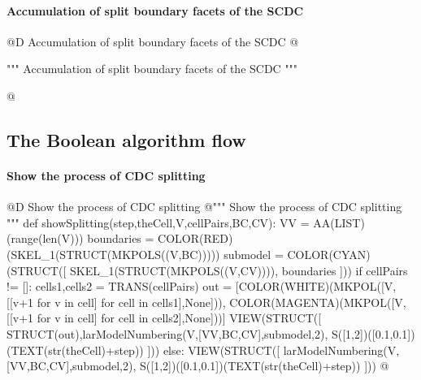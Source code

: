 \documentclass[11pt,oneside]{article}	%
\begin{document}
\paragraph{Accumulation of split boundary facets of the SCDC}

@D Accumulation of split boundary facets of the SCDC
@{""" Accumulation of split boundary facets of the SCDC """

@}



\subsection{The Boolean algorithm flow}


\paragraph{Show the process of CDC splitting}

@D Show the process of CDC splitting
@{""" Show the process of CDC splitting """
def showSplitting(step,theCell,V,cellPairs,BC,CV):
	VV = AA(LIST)(range(len(V)))
	boundaries = COLOR(RED)(SKEL_1(STRUCT(MKPOLS((V,BC)))))
	submodel = COLOR(CYAN)(STRUCT([ SKEL_1(STRUCT(MKPOLS((V,CV)))), boundaries ]))
	if cellPairs != []:
		cells1,cells2 = TRANS(cellPairs)
		out = [COLOR(WHITE)(MKPOL([V,[[v+1 for v in cell] for cell in cells1],None])), 
				COLOR(MAGENTA)(MKPOL([V,[[v+1 for v in cell] for cell in cells2],None]))]
		VIEW(STRUCT([ STRUCT(out),larModelNumbering(V,[VV,BC,CV],submodel,2), 
			S([1,2])([0.1,0.1])(TEXT(str(theCell)+step)) ]))
	else:
		VIEW(STRUCT([ larModelNumbering(V,[VV,BC,CV],submodel,2),
			S([1,2])([0.1,0.1])(TEXT(str(theCell)+step)) ]))
@}
\end{document}
